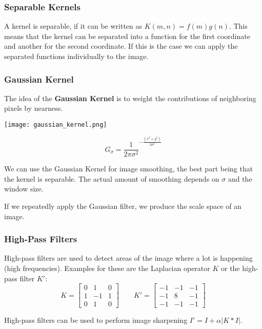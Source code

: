 \subsubsection{Separable Kernels}

A kernel is separable, if it can be written as $K(m, n) = f(m) g(n)$. This means that the kernel can be separated into a function for the first coordinate and another for the second coordinate. If this is the case we can apply the separated functions individually to the image.

\subsubsection{Gaussian Kernel}

The idea of the \textbf{Gaussian Kernel} is to weight the contributions of neighboring pixels by nearness.

\begin{center}
	\texttt{[image: gaussian\_kernel.png]}
\end{center}
$$G_\sigma = \frac{1}{2 \pi \sigma^2}^{- \frac{(x^2 + y^2)}{2 \sigma^2}}$$

We can use the Gaussian Kernel for image smoothing, the best part being that the kernel is separable. The actual amount of smoothing depends on $\sigma$ and the window size. \medskip

If we repeatedly apply the Gaussian filter, we produce the scale space of an image.

\subsubsection{High-Pass Filters}

High-pass filters are used to detect areas of the image where a lot is happening (high frequencies). Examples for these are the Laplacian operator $K$ or the high-pass filter $K'$:
$$ K = 
\begin{bmatrix}
    0 & 1 & 0\\
    1 & -1 & 1\\
    0 & 1 & 0
\end{bmatrix}
\qquad
K' =
\begin{bmatrix}
    -1 & -1 & -1\\
    -1 & 8 & -1\\
    -1 & -1 & -1
\end{bmatrix}
$$

High-pass filters can be used to perform image sharpening $I' = I + \alpha |K * I|$.
